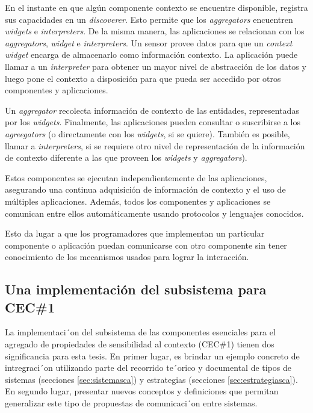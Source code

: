 En el instante en que algún componente contexto se encuentre disponible,
registra sus capacidades en un \textit{discoverer}. Esto permite que los
\textit{aggregators} encuentren \textit{widgets} e \textit{interpreters}. De la misma manera, las aplicaciones se relacionan con los \textit{aggregators}, \textit{widget} e \textit{interpreters}. Un sensor provee datos para que un \textit{context widget} encarga de almacenarlo como información contexto. La aplicación puede llamar a un \textit{interpreter} para obtener un mayor nivel de abstracción de los datos y luego pone el contexto a disposición para que pueda ser accedido por otros componentes y aplicaciones.

Un \textit{aggregator} recolecta información de contexto de las entidades,
representadas por los \textit{widgets}. Finalmente, las aplicaciones pueden
consultar o suscribirse a los \textit{agreegators} (o directamente con los \textit{widgets}, si se quiere). También es posible, llamar a \textit{interpreters}, si se requiere otro nivel de representación de la información de contexto diferente a las que proveen los \textit{widgets} y \textit{aggregators}).

Estos componentes se ejecutan independientemente de las aplicaciones, asegurando una continua adquisición de información de contexto y el uso de múltiples aplicaciones. Además, todos los componentes y aplicaciones se comunican entre ellos automáticamente usando protocolos y lenguajes conocidos.

Esto da lugar a que los programadores que implementan un particular componente o aplicación puedan comunicarse con otro componente sin tener conocimiento de los mecanismos usados para lograr la interacción.


\subsection{Una implementación del subsistema para CEC\#1}

La implementaci´on del subsistema de las componentes esenciales para el
agregado de propiedades de sensibilidad al contexto (CEC\#1) tienen dos
significancia para esta tesis. En primer lugar, es brindar un ejemplo concreto
de intregraci´on utilizando parte del recorrido te´orico y documental
de tipos de sistemas (secciones \ref{sec:sistemasca})  y estrategias (secciones
\ref{sec:estrategiasca}). En segundo lugar, presentar nuevos conceptos y
definiciones que permitan generalizar este tipo de propuestas de comunicaci´on
entre sistemas. 

